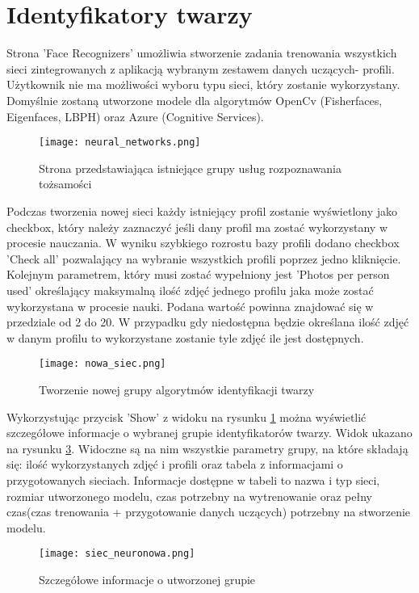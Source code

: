 \section{Identyfikatory twarzy}
Strona 'Face Recognizers' umożliwia stworzenie zadania trenowania wszystkich sieci zintegrowanych z aplikacją wybranym zestawem danych uczących- profili. Użytkownik nie ma możliwości wyboru typu sieci, który zostanie wykorzystany. Domyślnie zostaną utworzone modele dla algorytmów OpenCv (Fisherfaces, Eigenfaces, LBPH) oraz Azure (Cognitive Services).
\begin{figure}[H]
	\centering
	\texttt{[image: neural\_networks.png]}
	\caption{Strona przedstawiająca istniejące grupy usług rozpoznawania tożsamości}
	\label{fig:sieci_neuronowe}
\end{figure}
Podczas tworzenia nowej sieci każdy istniejący profil zostanie wyświetlony jako checkbox, który należy zaznaczyć jeśli dany profil ma zostać wykorzystany w procesie nauczania. W wyniku szybkiego rozrostu bazy profili dodano checkbox 'Check all' pozwalający na wybranie wszystkich profili poprzez jedno kliknięcie. Kolejnym parametrem, który musi zostać wypełniony jest 'Photos per person used' określający maksymalną ilość zdjęć jednego profilu jaka może zostać wykorzystana w procesie nauki. Podana wartość powinna znajdować się w przedziale od 2 do 20. W przypadku gdy niedostępna będzie określana ilość zdjęć w danym profilu to wykorzystane zostanie tyle zdjęć ile jest dostępnych.
\begin{figure}[H]
	\centering
	\texttt{[image: nowa\_siec.png]}
	\caption{Tworzenie nowej grupy algorytmów identyfikacji twarzy}
	\label{fig:nowa_siec}
\end{figure}
Wykorzystując przycisk 'Show' z widoku na rysunku \ref{fig:sieci_neuronowe} można wyświetlić szczegółowe informacje o wybranej grupie identyfikatorów twarzy. Widok ukazano na rysunku \ref{fig:siec_neuronowa}. Widoczne są na nim wszystkie parametry grupy, na które składają się: ilość wykorzystanych zdjęć i profili oraz tabela z informacjami o przygotowanych sieciach. Informacje dostępne w tabeli to nazwa i typ sieci, rozmiar utworzonego modelu, czas potrzebny na wytrenowanie oraz pełny czas(czas trenowania + przygotowanie danych uczących) potrzebny na stworzenie modelu.
\begin{figure}[H]
	\centering
	\texttt{[image: siec\_neuronowa.png]}
	\caption{Szczegółowe informacje o utworzonej grupie}
	\label{fig:siec_neuronowa}
\end{figure}

